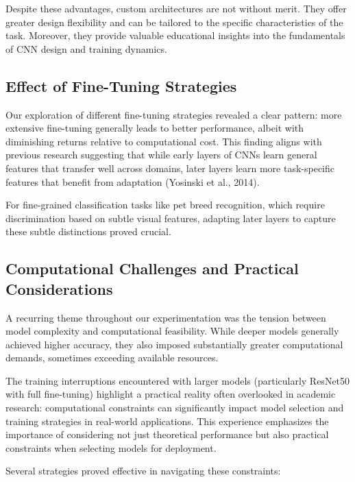 \documentclass[
]{article}
\begin{document}
Despite these advantages, custom architectures are not without merit.
They offer greater design flexibility and can be tailored to the
specific characteristics of the task. Moreover, they provide valuable
educational insights into the fundamentals of CNN design and training
dynamics.

\subsection{Effect of Fine-Tuning
Strategies}\label{effect-of-fine-tuning-strategies}

Our exploration of different fine-tuning strategies revealed a clear
pattern: more extensive fine-tuning generally leads to better
performance, albeit with diminishing returns relative to computational
cost. This finding aligns with previous research suggesting that while
early layers of CNNs learn general features that transfer well across
domains, later layers learn more task-specific features that benefit
from adaptation (Yosinski et al., 2014).

For fine-grained classification tasks like pet breed recognition, which
require discrimination based on subtle visual features, adapting later
layers to capture these subtle distinctions proved crucial.

\subsection{Computational Challenges and Practical
Considerations}\label{computational-challenges-and-practical-considerations}

A recurring theme throughout our experimentation was the tension between
model complexity and computational feasibility. While deeper models
generally achieved higher accuracy, they also imposed substantially
greater computational demands, sometimes exceeding available resources.

The training interruptions encountered with larger models (particularly
ResNet50 with full fine-tuning) highlight a practical reality often
overlooked in academic research: computational constraints can
significantly impact model selection and training strategies in
real-world applications. This experience emphasizes the importance of
considering not just theoretical performance but also practical
constraints when selecting models for deployment.

Several strategies proved effective in navigating these constraints:
\end{document}
